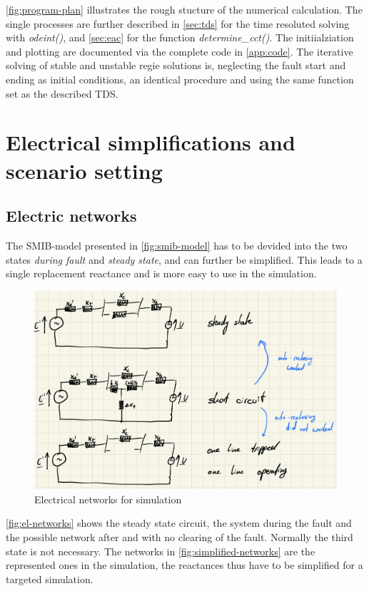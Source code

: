 \autoref{fig:program-plan} illustrates the rough stucture of the numerical calculation. The single processes are further described in \autoref{sec:tds} for the time resoluted solving with {\itshape odeint()}, and \autoref{sec:eac} for the function {\itshape determine\_cct()}. The initiialziation and plotting are documented via the complete code in \autoref{app:code}. The iterative solving of stable and unstable regie solutions is, neglecting the fault start and ending as initial conditions, an identical procedure and using the same function set as the described \acs{TDS}.

\section{Electrical simplifications and scenario setting}
\label{sec:scenario}

\subsection{Electric networks}
\label{sec:el-networks}

The \acs{SMIB}-model presented in \autoref{fig:smib-model} has to be devided into the two states {\itshape during fault} and {\itshape steady state}, and can further be simplified. This leads to a single replacement reactance and is more easy to use in the simulation.

\begin{figure}[H]
        \centering
        \includegraphics[width=.7\textwidth]{images/electrical_networks.png}
        \caption[Electrical networks for simulation]{Electrical networks for simulation}
        \label{fig:el-networks}
\end{figure}

\autoref{fig:el-networks} shows the steady state circuit, the system during the fault and the possible network after and with no clearing of the fault. Normally the third state is not necessary. The networks in \autoref{fig:simplified-networks} are the represented ones in the simulation, the reactances thus have to be simplified for a targeted simulation.

